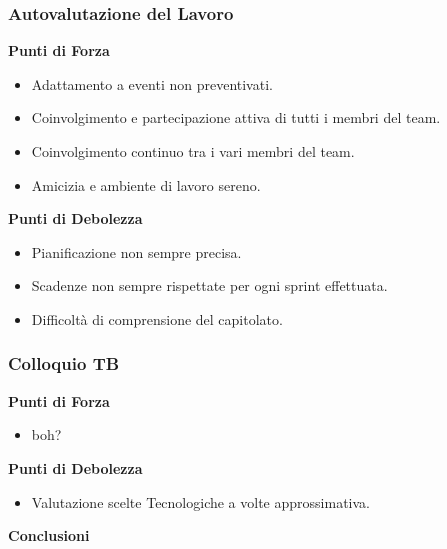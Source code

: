 \documentclass{beamer}
\begin{document}
\begin{frame}
    \frametitle{Autovalutazione del Lavoro}
    \begin{exampleblock}{\textbf{Punti di Forza}}
        \begin{itemize}
            \item Adattamento a eventi non preventivati.
            \item Coinvolgimento e partecipazione attiva di tutti i membri del team.
            \item Coinvolgimento continuo tra i vari membri del team.
            \item Amicizia e ambiente di lavoro sereno.
        \end{itemize}
    \end{exampleblock}
    \begin{alertblock}{\textbf{Punti di Debolezza}}
        \begin{itemize}
            \item Pianificazione non sempre precisa.
            \item Scadenze non sempre rispettate per ogni sprint effettuata.
            \item Difficoltà di comprensione del capitolato.
        \end{itemize}
    \end{alertblock}
\end{frame}

\begin{frame}
    \frametitle{Colloquio TB}
    \begin{exampleblock}{\textbf{Punti di Forza}}
        \begin{itemize}
            \item boh?
        \end{itemize}
    \end{exampleblock}
    \begin{alertblock}{\textbf{Punti di Debolezza}}
        \begin{itemize}
            \item Valutazione scelte Tecnologiche a volte approssimativa.
        \end{itemize}
    \end{alertblock}
\end{frame}

\begin{frame}
    \centering
    \vspace*{2cm}
    {\Huge \textbf{Conclusioni}}
    \vspace*{2cm}
\end{frame}
\end{document}

